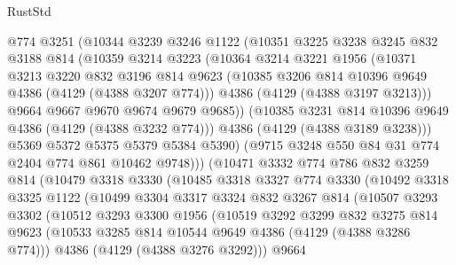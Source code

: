 \begin{lexlean}{RustStd}
\begin{coremodule}
              @774
              @3251
              (@10344
                @3239
                @3246
                @1122
                (@10351
                  @3225
                  @3238
                  @3245
                  @832
                  @3188
                  @814
                  (@10359
                    @3214
                    @3223
                    (@10364
                      @3214
                      @3221
                      @1956
                      (@10371
                        @3213
                        @3220
                        @832
                        @3196
                        @814
                        @9623
                        (@10385 @3206 @814 @10396 @9649 @4386 (@4129 (@4388 @3207 @774)))
                        @4386
                        (@4129 (@4388 @3197 @3213)))
                      @9664
                      @9667
                      @9670
                      @9674
                      @9679
                      @9685))
                  (@10385 @3231 @814 @10396 @9649 @4386 (@4129 (@4388 @3232 @774)))
                  @4386
                  (@4129 (@4388 @3189 @3238)))
                @5369
                @5372
                @5375
                @5379
                @5384
                @5390)
              (@9715 @3248 @550 @84 @31 @774 @2404 @774 @861 @10462 @9748)))
          (@10471
            @3332
            @774
            @786
            @832
            @3259
            @814
            (@10479
              @3318
              @3330
              (@10485
                @3318
                @3327
                @774
                @3330
                (@10492
                  @3318
                  @3325
                  @1122
                  (@10499
                    @3304
                    @3317
                    @3324
                    @832
                    @3267
                    @814
                    (@10507
                      @3293
                      @3302
                      (@10512
                        @3293
                        @3300
                        @1956
                        (@10519
                          @3292
                          @3299
                          @832
                          @3275
                          @814
                          @9623
                          (@10533 @3285 @814 @10544 @9649 @4386 (@4129 (@4388 @3286 @774)))
                          @4386
                          (@4129 (@4388 @3276 @3292)))
                        @9664

\end{coremodule}
\end{lexlean}
